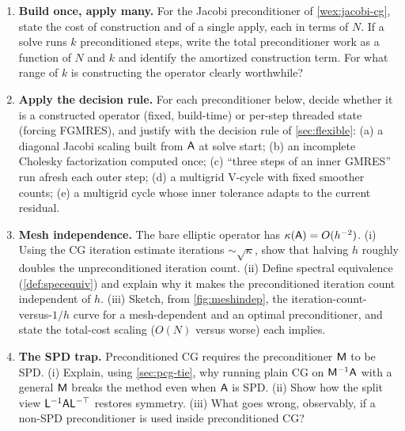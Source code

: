 \begin{enumerate}[nosep]
  why that prevention is a feature. (iii) Which chapter's abstraction (\cref{ch:operators}) is this
  an instance of, and what is the shared shape that lets a solver wear an operator's interface?
  \item \textbf{Build once, apply many.} For the Jacobi preconditioner of \cref{wex:jacobi-cg},
  state the cost of construction and of a single apply, each in terms of $N$. If a solve runs $k$
  preconditioned steps, write the total preconditioner work as a function of $N$ and $k$ and
  identify the amortized construction term. For what range of $k$ is constructing the operator
  clearly worthwhile?
  \item \textbf{Apply the decision rule.} For each preconditioner below, decide whether it is a
  constructed operator (fixed, build-time) or per-step threaded state (forcing FGMRES), and
  justify with the decision rule of \cref{sec:flexible}: (a) a diagonal Jacobi scaling built from
  $\mathsf{A}$ at solve start; (b) an incomplete Cholesky factorization computed once; (c) ``three
  steps of an inner GMRES'' run afresh each outer step; (d) a multigrid V-cycle with fixed smoother
  counts; (e) a multigrid cycle whose inner tolerance adapts to the current residual.
  \item \textbf{Mesh independence.} The bare elliptic operator has $\kappa(\mathsf{A})=O(h^{-2})$.
  (i) Using the CG iteration estimate iterations $\sim\sqrt{\kappa}$, show that halving $h$ roughly
  doubles the unpreconditioned iteration count. (ii) Define spectral equivalence
  (\cref{def:specequiv}) and explain why it makes the preconditioned iteration count independent of
  $h$. (iii) Sketch, from \cref{fig:meshindep}, the iteration-count-versus-$1/h$ curve for a
  mesh-dependent and an optimal preconditioner, and state the total-cost scaling ($O(N)$ versus
  worse) each implies.
  \item \textbf{The SPD trap.} Preconditioned CG requires the preconditioner $\mathsf{M}$ to be SPD.
  (i) Explain, using \cref{sec:pcg-tie}, why running plain CG on $\mathsf{M}^{-1}\mathsf{A}$ with a
  general $\mathsf{M}$ breaks the method even when $\mathsf{A}$ is SPD. (ii) Show how the split view
  $\mathsf{L}^{-1}\mathsf{A}\mathsf{L}^{-\top}$ restores symmetry. (iii) What goes wrong, observably, if a
  non-SPD preconditioner is used inside preconditioned CG?
\end{enumerate}
